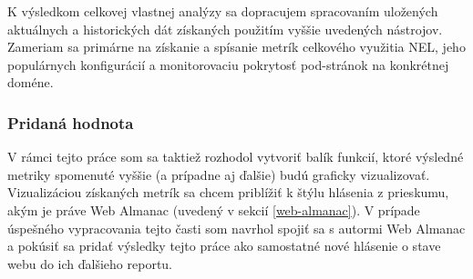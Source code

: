 K výsledkom celkovej vlastnej analýzy sa dopracujem spracovaním uložených aktuálnych a historických dát získaných použitím vyššie uvedených nástrojov.
Zameriam sa primárne na získanie a spísanie metrík celkového využitia NEL, jeho populárnych konfigurácií a monitorovaciu pokrytosť pod-stránok na konkrétnej doméne.


\subsubsection{Pridaná hodnota}

V rámci tejto práce som sa taktiež rozhodol vytvoriť balík funkcií, ktoré výsledné metriky spomenuté vyššie (a prípadne aj ďalšie) budú graficky vizualizovať.
Vizualizáciou získaných metrík sa chcem priblížiť k štýlu hlásenia z prieskumu, akým je práve Web Almanac (uvedený v sekcií \ref{web-almanac}).
V prípade úspešného vypracovania tejto časti som navrhol spojiť sa s autormi Web Almanac a pokúsiť sa pridať výsledky tejto práce ako samostatné nové hlásenie o stave webu do ich ďalšieho reportu. 

